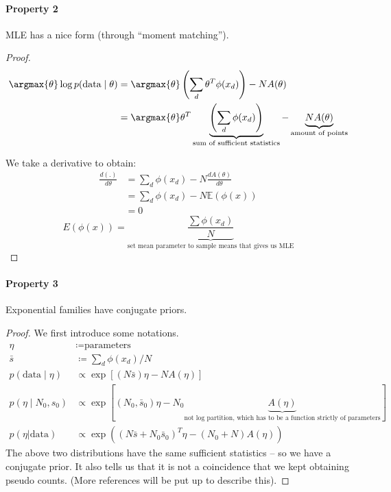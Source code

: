 \documentclass{article}
\begin{document}
\paragraph{Property 2} MLE has a nice form (through ``moment matching'').
\begin{proof}
\begin{align*} \argmax{\theta} \log p(\text{data} \mid \theta) &= \argmax{\theta} \left(\sum_d \theta^T\phi(x_d)\right) - NA(\theta) \\
&= \argmax{\theta}\theta^T\underbrace{\left(\sum_d\phi(x_d)\right)}_{\text{sum of sufficient statistics}} - \underbrace{NA(\theta)}_{\text{amount of points}}
\end{align*}

We take a derivative to obtain:
\begin{align*}
\frac{d(.)}{d \theta} &= \sum_d \phi(x_d) - N \frac{dA(\theta)}{d \theta} \\
&= \sum_d\phi(x_d) - N\mathbb{E}(\phi(x)) \\
 &= 0
\end{align*}
\[{E}(\phi(x)) = \underbrace{\frac{\sum\phi(x_d)}{N}}_{\text{set mean parameter to sample means that gives us MLE}}
\]
\end{proof}

\paragraph{Property 3} Exponential families have conjugate priors.

\begin{proof}
We first introduce some notations. 
\begin{align*}
\eta &\coloneqq \text{parameters}
\\
\bar{s} &\coloneqq \sum_d\phi(x_d) / N
\\
p(\text{data} \mid \eta) &\propto \exp [(N \bar s) \eta - N A(\eta)]
\\
p(\eta \mid N_0, s_0) &\propto \exp[ (N_0, \bar s_0) \eta - N_0 \underbrace{A(\eta)}_{\text{not log partition, which has to be a function strictly of parameters}}]
\\
p(\eta | \text{data}) &\propto \exp((N\bar{s} + N_0\bar{s}_0)^T\eta - (N_0 + N)A(\eta))
\end{align*}
The above two distributions have the same sufficient statistics -- so we have a conjugate prior. It also tells us that it is not a coincidence that we kept obtaining pseudo counts. (More references will be put up to describe this). 

\end{proof}
\end{document}
